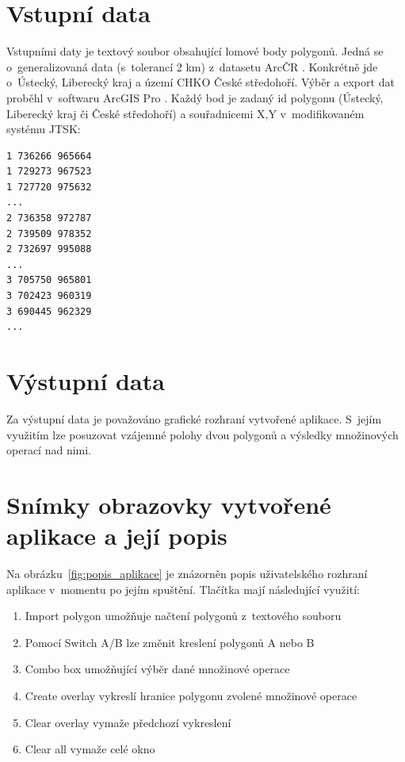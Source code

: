 \documentclass[a4paper, 12pt, oneside, titlepage]{article} %
\begin{document}
\section{Vstupní data}
Vstupními daty je textový soubor obsahující lomové body polygonů. Jedná se o~generalizovaná data (s~tolerancí 2 km) z~datasetu ArcČR \cite{arccr}. Konkrétně jde o~Ústecký, Liberecký kraj a území CHKO České středohoří. Výběr a export dat proběhl v~softwaru ArcGIS Pro \cite{arcgispro}. Každý bod je zadaný id polygonu (Ústecký, Liberecký kraj či České středohoří) a souřadnicemi X,Y v~modifikovaném systému JTSK:

\begin{verbatim}
1 736266 965664
1 729273 967523
1 727720 975632
...
2 736358 972787
2 739509 978352
2 732697 995088
...
3 705750 965801
3 702423 960319
3 690445 962329
...
\end{verbatim}



\section{Výstupní data}
Za výstupní data je považováno grafické rozhraní vytvořené aplikace. S~jejím využitím lze posuzovat vzájemné polohy dvou polygonů a výsledky množinových operací nad nimi.


\section{Snímky obrazovky vytvořené aplikace a její popis}\label{snimky}
Na obrázku~\ref{fig:popis_aplikace} je znázorněn popis uživatelského rozhraní aplikace v~momentu po jejím spuštění. Tlačítka mají následující využití:

\begin{enumerate}
\item Import polygon umožňuje načtení polygonů z~textového souboru
\item Pomocí Switch A/B lze změnit kreslení polygonů A nebo B
\item Combo box umožňující výběr dané množinové operace
\item Create overlay vykreslí hranice polygonu zvolené množinové operace
\item Clear overlay vymaže předchozí vykreslení
\item Clear all vymaže celé okno
\end{enumerate}
\end{document}
